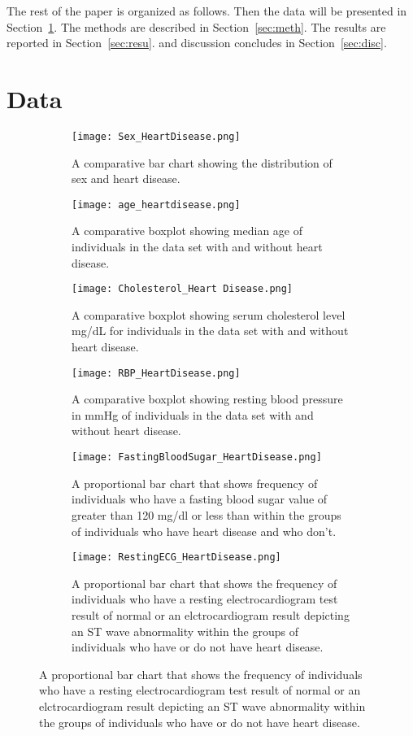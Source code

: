\documentclass[12pt]{article}
\begin{document}
The rest of the paper is organized as follows. 
Then the data will be presented in Section~\ref{sec:data}.
The methods are described in Section~\ref{sec:meth}.
The results are reported in Section~\ref{sec:resu}.
and discussion concludes in Section~\ref{sec:disc}.

\section{Data}
\label{sec:data}
\begin{figure}
  \centering
  \begin{subfigure}[b]{0.3\textwidth}
       \centering
       \texttt{[image: Sex\_HeartDisease.png]}
       \caption{A comparative bar chart showing the distribution of sex and heart disease.}
       \label{fig:heartdisease_and_sex}
   \end{subfigure}
   \hfill
   \begin{subfigure}[b]{0.3\textwidth}
       \centering
       \texttt{[image: age\_heartdisease.png]}
       \caption{A comparative boxplot showing median age of individuals in the data set with and without heart disease.}
       \label{fig:age_heartdisease}
   \end{subfigure}
   \hfill
   \begin{subfigure}[b]{0.3\textwidth}
       \centering
       \texttt{[image: Cholesterol\_Heart Disease.png]}
       \caption{A comparative boxplot showing serum cholesterol level mg/dL for individuals in the data set with and without heart disease.}
       \label{fig:cholesterol_heartdisease}
   \end{subfigure}
   
   \begin{subfigure}[b]{0.3\textwidth}
       \centering
       \texttt{[image: RBP\_HeartDisease.png]}
       \caption{A comparative boxplot showing resting blood pressure in mmHg of individuals in the data set with and without heart disease.}
       \label{fig:rbp_heartdisease}
   \end{subfigure}
   \hfill
   \begin{subfigure}[b]{0.3\textwidth}
       \centering
       \texttt{[image: FastingBloodSugar\_HeartDisease.png]}
       \caption{A proportional bar chart that shows frequency of individuals who have a fasting blood sugar value of greater than 120 mg/dl or less than within the groups of individuals who have heart disease and who don't.}
      \label{fig:FBS_heartdisease}
   \end{subfigure}
   \hfill
   \begin{subfigure}[b]{0.3\textwidth}
       \centering
       \texttt{[image: RestingECG\_HeartDisease.png]}
       \caption{A proportional bar chart that shows the frequency of individuals who have a resting electrocardiogram test result of normal or an elctrocardiogram result depicting an ST wave abnormality within the groups of individuals who have or do not have heart disease.}
      \label{fig:ECG_heartdisease}
   \end{subfigure}
   

\end{figure}
\end{document}
